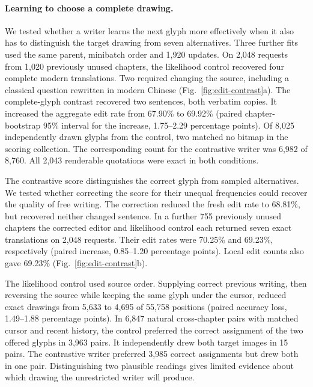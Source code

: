 \documentclass[12pt,a4paper]{article}
\providecommand{\DIFadd}[1]{{\protect\color{blue} \sf #1}} %
\begin{document}
\paragraph{\DIFadd{Learning to choose a complete drawing.}}
\DIFadd{We tested whether a writer learns the next glyph more effectively when it also has to distinguish the target drawing from seven alternatives. Three further fits used the same parent, minibatch order and 1,920 updates. On 2,048 requests from 1,020 previously unused chapters, the likelihood control recovered four complete modern translations. Two required changing the source, including a classical question rewritten in modern Chinese (Fig.~\ref{fig:edit-contrast}a). The complete-glyph contrast recovered two sentences, both verbatim copies. It increased the aggregate edit rate from 67.90\% to 69.92\% (paired chapter-bootstrap 95\% interval for the increase, 1.75--2.29 percentage points). Of 8,025 independently drawn glyphs from the control, two matched no bitmap in the scoring collection. The corresponding count for the contrastive writer was 6,982 of 8,760. All 2,043 renderable quotations were exact in both conditions.
}

\DIFadd{The contrastive score distinguishes the correct glyph from sampled alternatives. We tested whether correcting the score for their unequal frequencies could recover the quality of free writing. The correction reduced the fresh edit rate to 68.81\%, but recovered neither changed sentence. In a further 755 previously unused chapters the corrected editor and likelihood control each returned seven exact translations on 2,048 requests. Their edit rates were 70.25\% and 69.23\%, respectively (paired increase, 0.85--1.20 percentage points). Local edit counts also gave 69.23\% (Fig.~\ref{fig:edit-contrast}b).
}

\DIFadd{The likelihood control used source order. Supplying correct previous writing, then reversing the source while keeping the same glyph under the cursor, reduced exact drawings from 5,633 to 4,695 of 55,758 positions (paired accuracy loss, 1.49--1.88 percentage points). In 6,847 natural cross-chapter pairs with matched cursor and recent history, the control preferred the correct assignment of the two offered glyphs in 3,963 pairs. It independently drew both target images in 15 pairs. The contrastive writer preferred 3,985 correct assignments but drew both in one pair. Distinguishing two plausible readings gives limited evidence about which drawing the unrestricted writer will produce.
}
\end{document}
